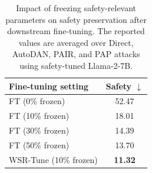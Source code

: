 \documentclass{article}
\begin{document}
\begin{table}
\vspace{-1.3\baselineskip}
\centering
\small
\caption{Impact of freezing safety-relevant parameters on safety preservation after downstream fine-tuning. 
The reported values are averaged over Direct, AutoDAN, PAIR, and PAP attacks using safety-tuned Llama-2-7B.}
\vspace{-0.5em}
\label{tab:basis_rotation_motivation}
\begin{tabular}{lc}
\toprule
\textbf{Fine-tuning setting} & \textbf{Safety $\downarrow$ } \\
\midrule
FT (0\% frozen)     & 52.47 \\
FT (10\% frozen)         & 18.01 \\
FT (30\% frozen)         & 14.39\\
FT (50\% frozen)         & 13.70 \\
WSR-Tune (10\% frozen)   & \textbf{11.32}\\
\bottomrule
\end{tabular}
\vspace{-1.4\baselineskip}
\end{table}

\end{document}
